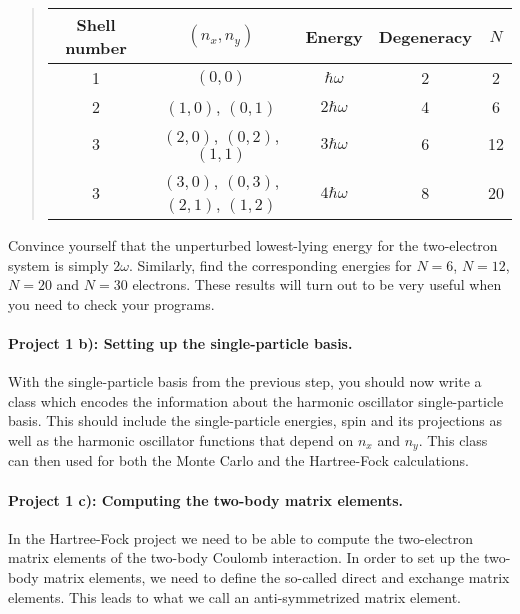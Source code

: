 \documentclass[%
oneside,                 %
final,                   %
10pt]{article}
\begin{document}
\begin{quote}
\begin{tabular}{ccccc}
\hline
\multicolumn{1}{c}{ Shell number } & \multicolumn{1}{c}{ $(n_x, n_y)$ } & \multicolumn{1}{c}{ Energy } & \multicolumn{1}{c}{ Degeneracy } & \multicolumn{1}{c}{ $N$ } \\
\hline
1            & $(0,0)$                            & $\hbar\omega$  & 2          & 2   \\
\hline
2            & $(1,0)$, $(0,1)$                   & $2\hbar\omega$ & 4          & 6   \\
\hline
3            & $(2,0)$, $(0,2)$, $(1,1)$          & $3\hbar\omega$ & 6          & 12  \\
\hline
3            & $(3,0)$, $(0,3)$, $(2,1)$, $(1,2)$ & $4\hbar\omega$ & 8          & 20  \\
\hline
\end{tabular}
\end{quote}

\noindent

Convince yourself that the unperturbed lowest-lying energy for the two-electron system  is simply $2\omega$. Similarly, find the corresponding energies for $N=6$, $N=12$, $N=20$ and $N=30$ electrons.
These results will turn out to be very useful when you need to check your programs.

\paragraph{Project 1 b): Setting up the single-particle basis.}
With the single-particle basis from the previous step, you should now write a class which encodes the information about the harmonic oscillator single-particle basis. This should include the single-particle energies, spin and its projections as well as the harmonic oscillator  functions that depend on $n_x$ and $n_y$. This class can then used for both the Monte Carlo and the Hartree-Fock calculations. 


\paragraph{Project 1 c): Computing the two-body matrix elements.}
In the Hartree-Fock project we need to be able to compute the two-electron matrix elements of the two-body Coulomb interaction. 
In order to set up the two-body matrix elements, we need to define the so-called direct and exchange matrix elements. This leads to what we call an anti-symmetrized matrix element.
\end{document}
